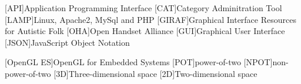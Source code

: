 [API]{Application Programming Interface}
[CAT]{Category Adminitration Tool}
[LAMP]{Linux, Apache2, MySql and PHP}
[GIRAF]{Graphical Interface Resources for Autistic Folk}
[OHA]{Open Handset Alliance}
[GUI]{Graphical User Interface}
[JSON]{JavaScript Object Notation}

[OpenGL ES]{OpenGL for Embedded Systems}
[POT]{power-of-two}
[NPOT]{non-power-of-two}
[3D]{Three-dimensional space}
[2D]{Two-dimensional space}